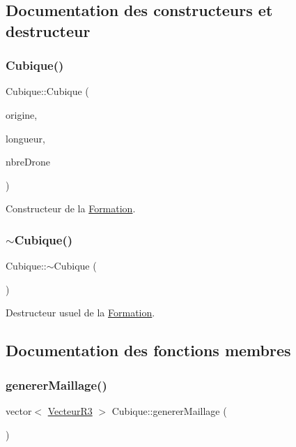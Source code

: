 \subsection{Documentation des constructeurs et destructeur}
\mbox{\label{class_cubique_ae437848fa7a382f250cf84d9b5c35154}} 
\subsubsection{\texorpdfstring{Cubique()}{Cubique()}}
{\footnotesize\ttfamily Cubique\+::\+Cubique (\begin{DoxyParamCaption}\item[{\mbox{\hyperlink{class_vecteur_r3}{Vecteur\+R3}}}]{origine,  }\item[{float}]{longueur,  }\item[{int}]{nbre\+Drone }\end{DoxyParamCaption})}

Constructeur de la \mbox{\hyperlink{class_formation}{Formation}}. \mbox{\label{class_cubique_a5880f332af7c4f412b74ae9a6a71909a}} 
\subsubsection{\texorpdfstring{$\sim$\+Cubique()}{~Cubique()}}
{\footnotesize\ttfamily Cubique\+::$\sim$\+Cubique (\begin{DoxyParamCaption}{ }\end{DoxyParamCaption})\hspace{0.3cm}{\ttfamily [virtual]}}

Destructeur usuel de la \mbox{\hyperlink{class_formation}{Formation}}. 

\subsection{Documentation des fonctions membres}
\mbox{\label{class_cubique_ac7f56ed79d1732b2bf59e0456b3a2f6f}} 
\subsubsection{\texorpdfstring{generer\+Maillage()}{genererMaillage()}}
{\footnotesize\ttfamily vector$<$ \mbox{\hyperlink{class_vecteur_r3}{Vecteur\+R3}} $>$ Cubique\+::generer\+Maillage (\begin{DoxyParamCaption}{ }\end{DoxyParamCaption})\hspace{0.3cm}{\ttfamily [virtual]}}

